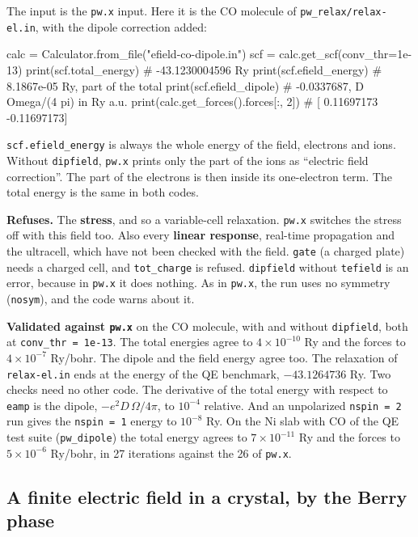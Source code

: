 \documentclass[11pt,a4paper]{article}
\newcommand{\code}[1]{\texttt{\small #1}}
\begin{document}
The input is the \code{pw.x} input. Here it is the CO molecule of
\code{pw\_relax/relax-el.in}, with the dipole correction added:
\begin{pycode}
calc = Calculator.from_file("efield-co-dipole.in")
scf = calc.get_scf(conv_thr=1e-13)
print(scf.total_energy)       # -43.1230004596 Ry
print(scf.efield_energy)      # 8.1867e-05 Ry, part of the total
print(scf.efield_dipole)      # -0.0337687, D Omega/(4 pi) in Ry a.u.
print(calc.get_forces().forces[:, 2])   # [ 0.11697173 -0.11697173]
\end{pycode}

\code{scf.efield\_energy} is always the whole energy of the field, electrons and
ions. Without \code{dipfield}, \code{pw.x} prints only the part of the ions as
``electric field correction''. The part of the electrons is then inside its
one-electron term. The total energy is the same in both codes.

\begin{refuses}
\textbf{Refuses.} The \textbf{stress}, and so a variable-cell relaxation.
\code{pw.x} switches the stress off with this field too. Also every
\textbf{linear response}, real-time propagation and the ultracell, which have not
been checked with the field. \code{gate} (a charged plate) needs a charged cell,
and \code{tot\_charge} is refused. \code{dipfield} without \code{tefield} is an
error, because in \code{pw.x} it does nothing. As in \code{pw.x}, the run uses no
symmetry (\code{nosym}), and the code warns about it.
\end{refuses}

\textbf{Validated against \code{pw.x}} on the CO molecule, with and without
\code{dipfield}, both at \code{conv\_thr = 1e-13}. The total energies agree to
$4\times10^{-10}$ Ry and the forces to $4\times10^{-7}$ Ry/bohr. The dipole and the
field energy agree too. The relaxation of \code{relax-el.in} ends at the energy of
the QE benchmark, $-43.1264736$ Ry. Two checks need no other code. The derivative
of the total energy with respect to \code{eamp} is the dipole, $-e^2 D\,\Omega/4\pi$,
to $10^{-4}$ relative. And an unpolarized \code{nspin = 2} run gives the
\code{nspin = 1} energy to $10^{-8}$ Ry. On the Ni slab with CO of the QE test
suite (\code{pw\_dipole}) the total energy agrees to $7\times10^{-11}$ Ry and the
forces to $5\times10^{-6}$ Ry/bohr, in 27 iterations against the 26 of
\code{pw.x}.

\subsection{A finite electric field in a crystal, by the Berry phase}
\end{document}
